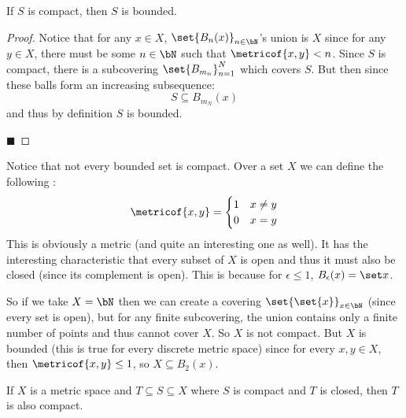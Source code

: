 \documentclass[10pt]{article}
\begin{document}
\begin{prop*}

    If $S$ is compact, then $S$ is bounded.

\end{prop*}

\begin{proof}

    Notice that for any $x\in X$, $\set{B_n(x)}_{n\in\bN}$'s union is $X$ since for any $y\in X$, there must be some $n\in\bN$ such that $\metricof{x,y}<n$.
    Since $S$ is compact, there is a subcovering $\set{B_{m_n}}_{n=1}^N$ which covers $S$.
    But then since these balls form an increasing subsequence:
    \[ S\subseteq B_{m_N}(x) \]
    and thus by definition $S$ is bounded.

    \hfill$\blacksquare$

\end{proof}

\begin{exam}

    Notice that not every bounded set is compact.
    Over a set $X$ we can define the following :
    \[ \metricof{x,y} = \begin{cases} 1 & x\neq y \\ 0 & x=y \end{cases} \]
    This is obviously a metric (and quite an interesting one as well).
    It has the interesting characteristic that every subset of $X$ is open and thus it must also be closed (since its complement is open).
    This is because for $\epsilon\leq1$, $B_\epsilon(x)=\set x$.

    So if we take $X=\bN$ then we can create a covering $\set{\set{x}}_{x\in\bN}$ (since every set is open), but for any finite subcovering, the union contains
    only a finite number of points and thus cannot cover $X$.
    So $X$ is not compact.
    But $X$ is bounded (this is true for every discrete metric space) since for every $x,y\in X$, then $\metricof{x,y}\leq1$, so $X\subseteq B_2(x)$.

\end{exam}

\begin{prop*}

    If $X$ is a metric space and $T\subseteq S\subseteq X$ where $S$ is compact and $T$ is closed, then $T$ is also compact.

\end{prop*}
\end{document}
